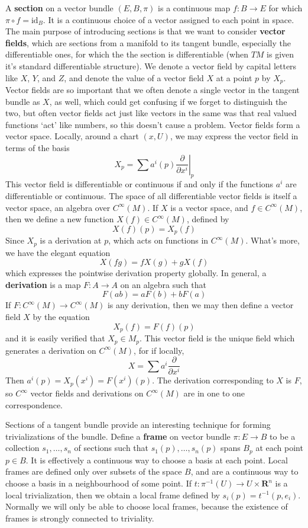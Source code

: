 A {\bf section} on a vector bundle $(E,B,\pi)$ is a continuous map $f:B \to E$ for which $\pi \circ f = \text{id}_B$. It is a continuous choice of a vector assigned to each point in space. The main purpose of introducing sections is that we want to consider {\bf vector fields}, which are sections from a manifold to its tangent bundle, especially the differentiable ones, for which the the section is differentiable (when $TM$ is given it's standard differentiable structure). We denote a vector field by capital letters like $X$, $Y$, and $Z$, and denote the value of a vector field $X$ at a point $p$ by $X_p$. Vector fields are so important that we often denote a single vector in the tangent bundle as $X$, as well, which could get confusing if we forget to distinguish the two, but often vector fields act just like vectors in the same was that real valued functions `act' like numbers, so this doesn't cause a problem. Vector fields form a vector space. Locally, around a chart $(x,U)$, we may express the vector field in terms of the basis
%
\[ X_p = \sum a^i(p) \left.\frac{\partial}{\partial x^i}\right|_p \]
%
This vector field is differentiable or continuous if and only if the functions $a^i$ are differentiable or continuous. The space of all differentiable vector fields is itself a vector space, an algebra over $C^\infty(M)$. If $X$ is a vector space, and $f \in C^\infty(M)$, then we define a new function $X(f) \in C^\infty(M)$, defined by
%
\[ X(f)(p) = X_p(f) \]
%
Since $X_p$ is a derivation at $p$, which acts on functions in $C^\infty(M)$. What's more, we have the elegant equation
%
\[ X(fg) = f X(g) + g X(f) \]
%
which expresses the pointwise derivation property globally. In general, a {\bf derivation} is a map $F: A \to A$ on an algebra such that
%
\[ F(ab) = a F(b) + b F(a) \]
%
If $F: C^\infty(M) \to C^\infty(M)$ is any derivation, then we may then define a vector field $X$ by the equation
%
\[ X_p(f) = F(f)(p) \]
%
and it is easily verified that $X_p \in M_p$. This vector field is the unique field which generates a derivation on $C^\infty(M)$, for if locally,
%
\[ X = \sum a^i \frac{\partial}{\partial x^i} \]
%
Then $a^i(p) = X_p(x^i) = F(x^i)(p)$. The derivation corresponding to $X$ is $F$, so $C^\infty$ vector fields and derivations on $C^\infty(M)$ are in one to one correspondence.

Sections of a tangent bundle provide an interesting technique for forming trivializations of the bundle. Define a {\bf frame} on vector bundle $\pi: E \to B$ to be a collection $s_1, \dots, s_n$ of sections such that $s_1(p), \dots, s_n(p)$ spans $B_p$ at each point $p \in B$. It is effectively a continuous way to choose a basis at each point. Local frames are defined only over subsets of the space $B$, and are a continuous way to choose a basis in a neighbourhood of some point. If $t: \pi^{-1}(U) \to U \times \mathbf{R}^n$ is a local trivialization, then we obtain a local frame defined by $s_i(p) = t^{-1}(p,e_i)$. Normally we will only be able to choose local frames, because the existence of frames is strongly connected to triviality.

